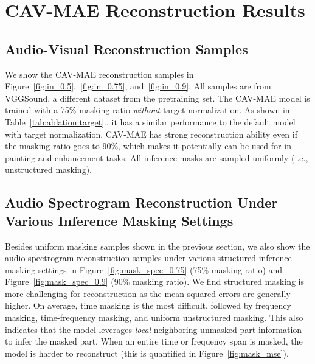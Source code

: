 \documentclass{article} \usepackage{iclr2023_conference,times}
\begin{document}
\section{CAV-MAE Reconstruction Results}
\label{sec:reconstruction}

\subsection{Audio-Visual Reconstruction Samples}

We show the CAV-MAE reconstruction samples in Figure~\ref{fig:in_0.5},~\ref{fig:in_0.75}, and~\ref{fig:in_0.9}. All samples are from VGGSound, a different dataset from the pretraining set. The CAV-MAE model is trained with a 75\% masking ratio \emph{without} target normalization. As shown in Table~\ref{tab:ablation:target}., it has a similar performance to the default model with target normalization. CAV-MAE has strong reconstruction ability even if the masking ratio goes to 90\%, which makes it potentially can be used for in-painting and enhancement tasks. All inference masks are sampled uniformly (i.e., unstructured masking).

\subsection{Audio Spectrogram Reconstruction Under Various Inference Masking Settings}
\label{sec:audio_mask_mae}

Besides uniform masking samples shown in the previous section, we also show the audio spectrogram reconstruction samples under various structured inference masking settings in Figure~\ref{fig:mask_spec_0.75} (75\% masking ratio) and Figure~\ref{fig:mask_spec_0.9} (90\% masking ratio). We find structured masking is more challenging for reconstruction as the mean squared errors are generally higher. On average, time masking is the most difficult, followed by frequency masking, time-frequency masking, and uniform unstructured masking. This also indicates that the model leverages \emph{local} neighboring unmasked part information to infer the masked part. When an entire time or frequency span is masked, the model is harder to reconstruct (this is quantified in Figure~\ref{fig:mask_mse}). 
\end{document}
